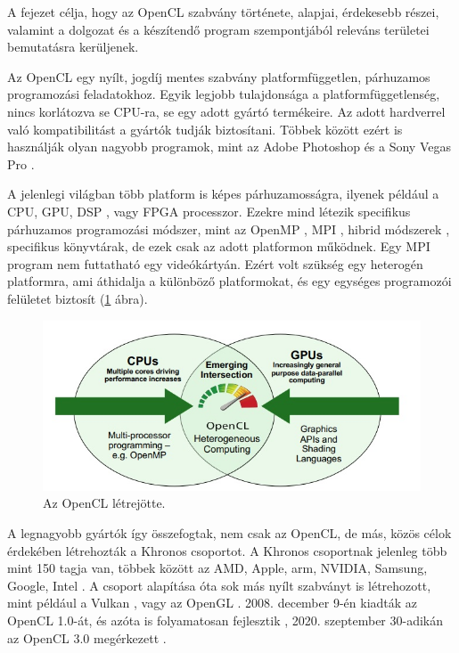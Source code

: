 
A fejezet célja, hogy az OpenCL szabvány története, alapjai, érdekesebb részei, valamint a dolgozat és a készítendő program szempontjából releváns területei bemutatásra kerüljenek.

Az OpenCL egy nyílt, jogdíj mentes szabvány platformfüggetlen, párhuzamos programozási feladatokhoz. Egyik legjobb tulajdonsága a platformfüggetlenség, nincs korlátozva se CPU-ra, se egy adott gyártó termékeire. Az adott hardverrel való kompatibilitást a gyártók tudják biztosítani. Többek között ezért is használják olyan nagyobb programok, mint az Adobe Photoshop \cite{adobe} és a Sony Vegas Pro \cite{vegas}.

A jelenlegi világban több platform is képes párhuzamosságra, ilyenek például a CPU, GPU, DSP \cite{dsp}, vagy FPGA \cite{fpga} processzor. Ezekre mind létezik specifikus párhuzamos programozási módszer, mint az OpenMP \cite{openmp}, MPI \cite{mpi}, hibrid módszerek \cite{hybrid}, specifikus könyvtárak, de ezek csak az adott platformon működnek. Egy MPI program nem futtatható egy videókártyán. Ezért volt szükség egy heterogén platformra, ami áthidalja a különböző platformokat, és egy egységes programozói felületet biztosít (\ref{fig:openCl} ábra).

\begin{figure}[h]
\centering
\includegraphics[scale=0.7]{images/opencl_origin.jpg}
\caption{Az OpenCL létrejötte. \cite{opencl_origin}}
\label{fig:openCl}
\end{figure}

A legnagyobb gyártók így összefogtak, nem csak az OpenCL, de más, közös célok érdekében létrehozták a Khronos csoportot. A Khronos csoportnak jelenleg több mint 150 tagja van, többek között az AMD, Apple, arm, NVIDIA, Samsung, Google, Intel \cite{khronos_about} \cite{khronos_members}. A csoport alapítása óta sok más nyílt szabványt is létrehozott, mint például a Vulkan \cite{vulkan}, vagy az OpenGL \cite{opengl}. 2008. december 9-én kiadták az OpenCL 1.0-át, és azóta is folyamatosan fejlesztik \cite{opencl1}, 2020. szeptember 30-adikán az OpenCL 3.0 megérkezett \cite{opencl}.

